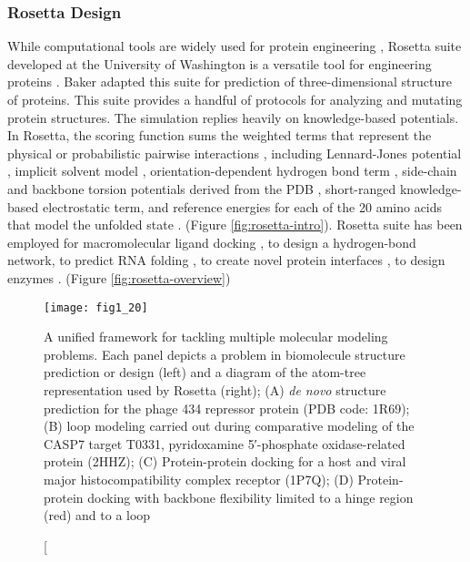 \begin{refsection}
\subsubsection{Rosetta Design}

While computational tools are widely used for protein
engineering \cite{Rothlisberger2008,DiMaio2011a,Korkegian2005,
Leaver-Fay2013a,Leaver-Fay2011,Drew2013a,Kaufmann2010,Rohl2004}, Rosetta suite
developed at the University of Washington is a versatile tool for engineering
proteins \cite{Leaver-Fay2011}. Baker  adapted this suite for
prediction of three-dimensional structure of proteins\cite{Leaver-Fay2011}.
This suite provides a handful of protocols for analyzing and mutating protein
structures.  The simulation replies heavily on knowledge-based potentials. In
Rosetta, the scoring function sums the weighted terms that represent the
physical or probabilistic pairwise interactions \cite{Rohl2004}, including
Lennard-Jones potential \cite{Clementi1999}, implicit solvent
model \cite{Lazaridis1999}, orientation-dependent hydrogen bond
term \cite{Kortemme2003}, side-chain and backbone torsion potentials derived from
the PDB \cite{Rohl2002}, short-ranged knowledge-based electrostatic
term\cite{Leaver-Fay2013a}, and reference energies for each of the 20 amino
acids that model the unfolded state \cite{Leaver-Fay2013a}. (Figure
\ref{fig:rosetta-intro}). Rosetta suite has been employed for
macromolecular ligand docking \cite{Willcox2003}, to design a hydrogen-bond
network\cite{Rohl2004}, to predict RNA folding \cite{Das2007,Egli2002}, to
create novel protein interfaces \cite{Jiang2008,Hennig2002}, to design
enzymes \cite{Ashworth2006a}. (Figure \ref{fig:rosetta-overview})
\begin{figure}[p] \centering \texttt{[image: fig1\_20]}
    \caption[A unified framework for tackling multiple molecular modeling
        problems. Each panel depicts a problem in biomolecule structure
        prediction or design (left) and a diagram of the atom-tree
        representation used by Rosetta (right); (A) \emph{de novo} structure
        prediction for the phage 434 repressor protein (PDB code: 1R69); (B)
        loop modeling carried out during comparative modeling of the CASP7
        target T0331, pyridoxamine 5′-phosphate oxidase-related protein (2HHZ);
        (C) Protein-protein docking for a host and viral major
        histocompatibility complex receptor (1P7Q); (D) Protein-protein docking
        with backbone flexibility limited to a hinge region (red) and to a loop

\end{figure}
\end{refsection}
